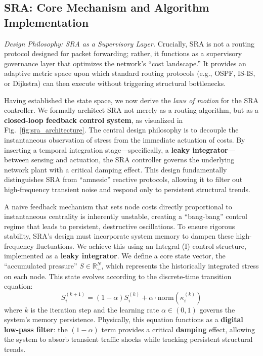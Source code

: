 \documentclass[journal]{IEEEtran}
\theoremstyle{plain}
\theoremstyle{definition}
\begin{document}
\subsection{SRA: Core Mechanism and Algorithm Implementation}
\label{subsec:sra_mechanism}

\textit{Design Philosophy: SRA as a Supervisory Layer.} 
Crucially, SRA is not a routing protocol designed for packet forwarding; rather, it functions as a supervisory governance layer that optimizes the network's ``cost landscape.'' It provides an adaptive metric space upon which standard routing protocols (e.g., OSPF, IS-IS, or Dijkstra) can then execute without triggering structural bottlenecks.

Having established the state space, we now derive the \textit{laws of motion} for the SRA controller. 
We formally architect SRA not merely as a routing algorithm, but as a \textbf{closed-loop feedback control system}, as visualized in Fig.~\ref{fig:sra_architecture}. 
The central design philosophy is to decouple the instantaneous observation of stress from the immediate actuation of costs. 
By inserting a temporal integration stage---specifically, a \textbf{leaky integrator}---between sensing and actuation, the SRA controller governs the underlying network plant with a critical damping effect. 
This design fundamentally distinguishes SRA from ``amnesic'' reactive protocols, allowing it to filter out high-frequency transient noise and respond only to persistent structural trends.

A naive feedback mechanism that sets node costs directly proportional to instantaneous centrality is inherently unstable, creating a ``bang-bang'' control regime that leads to persistent, destructive oscillations. 
To ensure rigorous stability, SRA's design must incorporate system memory to dampen these high-frequency fluctuations. 
We achieve this using an Integral (I) control structure, implemented as a \textbf{leaky integrator}. 
We define a core state vector, the ``accumulated pressure'' $S \in \mathbb{R}^N_+$, which represents the historically integrated stress on each node. 
This state evolves according to the discrete-time transition equation:
\begin{equation}
    \label{eq:pressure_update}
    S_i^{(k+1)} = (1 - \alpha) S_i^{(k)} + \alpha \cdot \mathrm{norm}(\kappa_i^{(k)})
\end{equation}
where $k$ is the iteration step and the learning rate $\alpha \in (0,1)$ governs the system's memory persistence. 
Physically, this equation functions as a \textbf{digital low-pass filter}: the $(1-\alpha)$ term provides a critical \textbf{damping} effect, allowing the system to absorb transient traffic shocks while tracking persistent structural trends.
\end{document}
